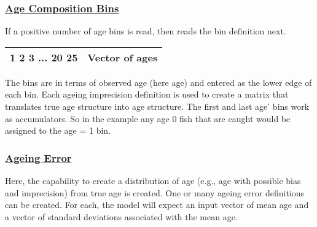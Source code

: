 \subsubsection[Age Composition Bins]{\protect\hyperlink{AgeCompBins}{Age Composition Bins}}
If a positive number of age bins is read, then reads the bin definition next.
\begin{center}
	\vspace*{-\baselineskip}
	\begin{tabular}{p{3cm} p{13cm}}
		\hline
		1 2 3 ... 20 25 & Vector of ages \Tstrut\Bstrut\\
		\hline		
	\end{tabular}
\end{center}
The bins are in terms of observed age (here age) and entered as the lower edge of each bin. Each ageing imprecision definition is used to create a matrix that translates true age structure into age structure. The first and last age' bins work as accumulators. So in the example any age 0 fish that are caught would be assigned to the age = 1 bin.

\hypertarget{AgeError}{}
\subsubsection[Ageing Error]{\protect\hyperlink{AgeError}{Ageing Error}}
Here, the capability to create a distribution of age (e.g., age with possible bias and imprecision) from true age is created. One or many ageing error definitions can be created. For each, the model will expect an input vector of mean age and a vector of standard deviations associated with the mean age. 

